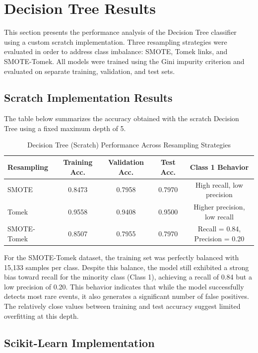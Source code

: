 \section{Decision Tree Results}

This section presents the performance analysis of the Decision Tree classifier using a custom scratch implementation. 
Three resampling strategies were evaluated in order to address class imbalance: SMOTE, Tomek links, and SMOTE-Tomek. 
All models were trained using the Gini impurity criterion and evaluated on separate training, validation, and test sets.

\subsection{Scratch Implementation Results}

The table below summarizes the accuracy obtained with the scratch Decision Tree using a fixed maximum depth of 5.

\begin{table}[H]
\centering
\caption{Decision Tree (Scratch) Performance Across Resampling Strategies}
\label{tab:dt_scratch_results}
\begin{tabular}{|l|c|c|c|c|}
\hline
\textbf{Resampling} & \textbf{Training Acc.} & \textbf{Validation Acc.} & \textbf{Test Acc.} & \textbf{Class 1 Behavior} \\ \hline
SMOTE & 0.8473 & 0.7958 & 0.7970 & High recall, low precision \\ \hline
Tomek & 0.9558 & 0.9408 & 0.9500 & Higher precision, low recall \\ \hline
SMOTE-Tomek & 0.8507 & 0.7955 & 0.7970 & Recall = 0.84, Precision = 0.20 \\ \hline
\end{tabular}
\end{table}

For the SMOTE-Tomek dataset, the training set was perfectly balanced with 15,133 samples per class. 
Despite this balance, the model still exhibited a strong bias toward recall for the minority class (Class 1), achieving a recall of 0.84 but a low precision of 0.20. 
This behavior indicates that while the model successfully detects most rare events, it also generates a significant number of false positives. 
The relatively close values between training and test accuracy suggest limited overfitting at this depth.

\subsection{Scikit-Learn Implementation}

